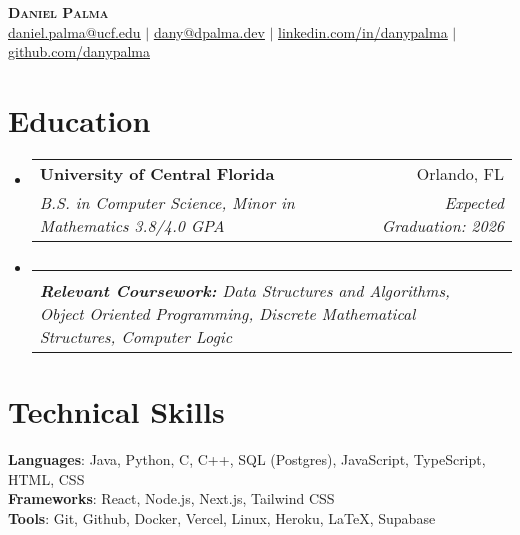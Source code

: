 \documentclass[letterpaper,11pt]{article}
\makeatletter
\newcommand{\resumeSubheading}[4]{
  \vspace{-2pt}\item
    \begin{tabular*}{0.97\textwidth}[t]{l@{\extracolsep{\fill}}r}
      \textbf{#1} & #2 \\
      \textit{\small#3} & \textit{\small #4} \\
    \end{tabular*}\vspace{-7pt}
}
\newcommand{\resumeSubHeadingListStart}{\begin{itemize}[leftmargin=0.15in, label={}]}
\newcommand{\resumeSubHeadingListEnd}{\end{itemize}}
\makeatother
\begin{document}

\begin{center}
    \textbf{\Huge \scshape Daniel Palma} \\ \vspace{1pt}
    \href{mailto:daniel.palma@ucf.edu}{\underline{daniel.palma@ucf.edu}} $|$ \href{mailto:dany@dpalma.dev}{\underline{dany@dpalma.dev}} $|$ 
    \href{https://linkedin.com/in/danypalma}{\underline{linkedin.com/in/danypalma}} $|$
    \href{https://github.com/DanyPalma}{\underline{github.com/danypalma}}
\end{center}


\section{Education}
  \resumeSubHeadingListStart
    \resumeSubheading
      {University of Central Florida}{Orlando, FL}
      {B.S. in Computer Science, Minor in Mathematics 3.8/4.0 GPA}{Expected Graduation: 2026}
    
      \vspace{-15pt}
    \resumeSubheading
      {}{}
      {\scriptsize{\textbf{Relevant Coursework: }Data Structures and Algorithms, Object Oriented Programming, Discrete Mathematical Structures, Computer Logic}}{}
  \resumeSubHeadingListEnd


\section{Technical Skills}
 \begin{itemize}[leftmargin=0.15in, label={}]
    \small{\item{
     \textbf{Languages}{: Java, Python, C, C++, SQL (Postgres), JavaScript, TypeScript, HTML, CSS} \\
     \textbf{Frameworks}{: React, Node.js, Next.js, Tailwind CSS} \\
     \textbf{Tools}{: Git, Github, Docker, Vercel, Linux, Heroku, LaTeX, Supabase} \\
    }}
 \end{itemize}
\end{document}
